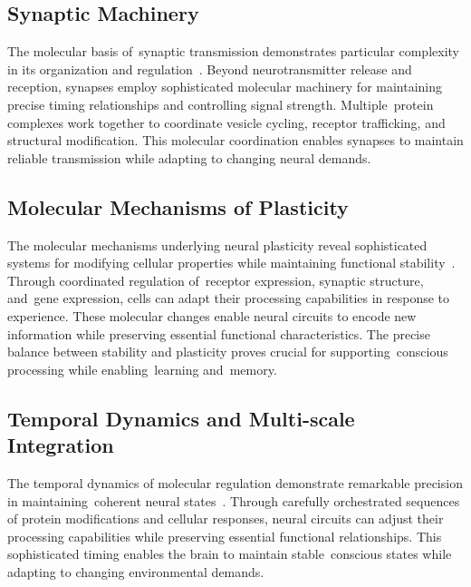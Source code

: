 \subsection*{Synaptic Machinery~}

The molecular basis of~synaptic transmission demonstrates particular complexity in its organization and regulation~\cite{Sudhof2018, Choquet2013}. Beyond neurotransmitter release and reception, synapses employ sophisticated molecular machinery for maintaining precise timing relationships and controlling signal strength. Multiple~protein complexes work together to coordinate vesicle cycling, receptor trafficking, and structural modification. This molecular coordination enables synapses to maintain reliable transmission while adapting to changing neural demands.

\subsection*{Molecular Mechanisms of Plasticity~}

The molecular mechanisms underlying neural plasticity reveal sophisticated systems for modifying cellular properties while maintaining functional stability~\cite{Takeuchi2014, Nussinov2013}. Through coordinated regulation of~receptor expression, synaptic structure, and~gene expression, cells can adapt their processing capabilities in response to experience. These molecular changes enable neural circuits to encode new information while preserving essential functional characteristics. The precise balance between stability and plasticity proves crucial for supporting~conscious processing while enabling~learning and~memory.

\subsection*{Temporal Dynamics and Multi-scale Integration~}

The temporal dynamics of molecular regulation demonstrate remarkable precision in maintaining~coherent neural states~\cite{Namburi2016, Davis2018}. Through carefully orchestrated sequences of protein modifications and cellular responses, neural circuits can adjust their processing capabilities while preserving essential functional relationships. This sophisticated timing enables the brain to maintain stable~conscious states while adapting to changing environmental demands.

